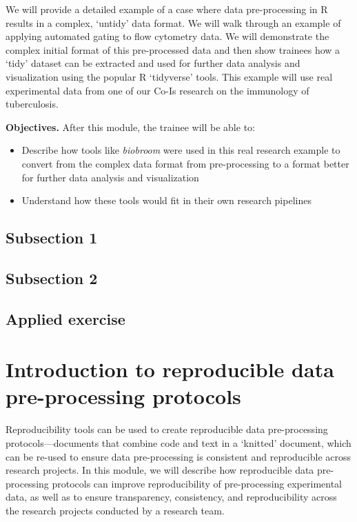 \documentclass[]{tufte-book}
\providecommand{\tightlist}{%
  \setlength{\itemsep}{0pt}\setlength{\parskip}{0pt}}
\begin{document}
We will provide a detailed example of a case where data pre-processing in R
results in a complex, `untidy' data format. We will walk through an example of
applying automated gating to flow cytometry data. We will demonstrate the
complex initial format of this pre-processed data and then show trainees how a
`tidy' dataset can be extracted and used for further data analysis and
visualization using the popular R `tidyverse' tools. This example will use real
experimental data from one of our Co-Is research on the immunology of
tuberculosis.

\textbf{Objectives.} After this module, the trainee will be able to:

\begin{itemize}
\tightlist
\item
  Describe how tools like \textit{biobroom} were used in this real research
  example to convert from the complex data format from pre-processing to a format
  better for further data analysis and visualization
\item
  Understand how these tools would fit in their own research pipelines
\end{itemize}

\hypertarget{subsection-1}{%
\subsection{Subsection 1}\label{subsection-1}}

\hypertarget{subsection-2}{%
\subsection{Subsection 2}\label{subsection-2}}

\hypertarget{applied-exercise}{%
\subsection{Applied exercise}\label{applied-exercise}}

\hypertarget{introduction-to-reproducible-data-pre-processing-protocols}{%
\section{Introduction to reproducible data pre-processing protocols}\label{introduction-to-reproducible-data-pre-processing-protocols}}

Reproducibility tools can be used to create reproducible data pre-processing
protocols---documents that combine code and text in a `knitted' document, which
can be re-used to ensure data pre-processing is consistent and reproducible
across research projects. In this module, we will describe how reproducible data
pre-processing protocols can improve reproducibility of pre-processing
experimental data, as well as to ensure transparency, consistency, and
reproducibility across the research projects conducted by a research team.
\end{document}
